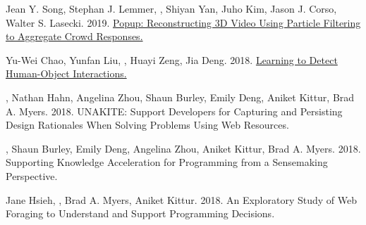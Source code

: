 

\begin{cvpubs}
{Jean Y. Song, Stephan J. Lemmer, , Shiyan Yan, Juho Kim, Jason J. Corso, Walter S. Lasecki. 2019. \href{https://doi.org/10.1145/3301275.3302305}{Popup: Reconstructing 3D Video Using Particle Filtering to Aggregate Crowd Responses.} } %

{Yu-Wei Chao, Yunfan Liu, , Huayi Zeng, Jia Deng. 2018. \href{https://doi.org/10.1109/WACV.2018.00048}{Learning to Detect Human-Object Interactions.} } %
\end{cvpubs}


\begin{cvpubs}
{, Nathan Hahn, Angelina Zhou, Shaun Burley, Emily Deng, Aniket Kittur, Brad A. Myers. 2018. UNAKITE: Support Developers for Capturing and Persisting Design Rationales When Solving Problems Using Web Resources. } %

{, Shaun Burley, Emily Deng, Angelina Zhou, Aniket Kittur, Brad A. Myers. 2018. Supporting Knowledge Acceleration for Programming from a Sensemaking Perspective. } %
\end{cvpubs}



\begin{cvpubs}
{Jane Hsieh, , Brad A. Myers, Aniket Kittur. 2018. An Exploratory Study of Web Foraging to Understand and Support Programming Decisions. } %
\end{cvpubs}

